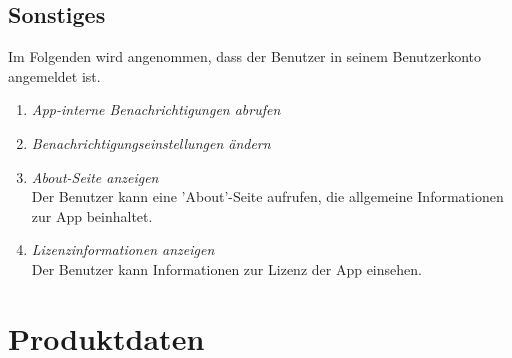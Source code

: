 \documentclass[parskip=full]{scrartcl}
\def\threedigits#1{%
  \ifnum#1<100 0\fi
  \ifnum#1<10 0\fi
  \number#1}
\begin{document}
\subsection{Sonstiges}
Im Folgenden wird angenommen, dass der Benutzer in seinem Benutzerkonto angemeldet ist.

\begin{enumerate}[label={\textbf{/F\protect\threedigits{\theenumi}0/}}, leftmargin=*, resume]	
	\item \textit{App-interne Benachrichtigungen abrufen} \\
	\item \textit{Benachrichtigungseinstellungen ändern} \\
	\item \textit{About-Seite anzeigen} \\
	Der Benutzer kann eine 'About'-Seite aufrufen, die allgemeine Informationen zur App beinhaltet.
	\item \textit{Lizenzinformationen anzeigen} \\
	Der Benutzer kann Informationen zur Lizenz der App einsehen.
\end{enumerate}

\newpage
\section{Produktdaten}
\end{document}

